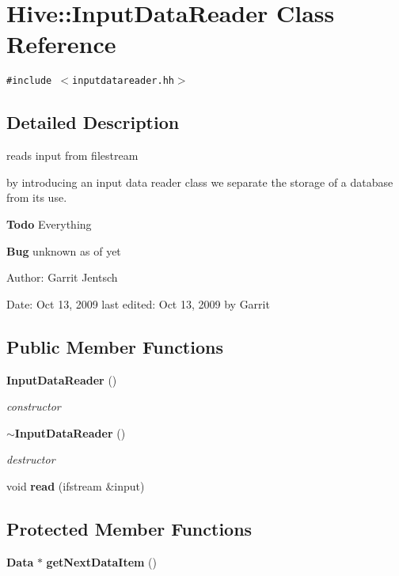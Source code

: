 \section{Hive::InputDataReader Class Reference}
\label{classHive_1_1InputDataReader}
{\tt \#include $<$inputdatareader.hh$>$}



\subsection{Detailed Description}
reads input from filestream 

by introducing an input data reader class we separate the storage of a database from its use.

\begin{Desc}
\item[{\bf Todo}]Everything\end{Desc}
\begin{Desc}
\item[{\bf Bug}]unknown as of yet\end{Desc}
\begin{Desc}
\item[Author:]Garrit Jentsch\end{Desc}
\begin{Desc}
\item[Date:]Oct 13, 2009 last edited: Oct 13, 2009 by Garrit \end{Desc}
\subsection*{Public Member Functions}
\begin{CompactItemize}
\item 
{\bf InputDataReader} ()
\begin{CompactList}\small\item\em constructor \item\end{CompactList}\item 
{\bf $\sim$InputDataReader} ()
\begin{CompactList}\small\item\em destructor \item\end{CompactList}\item 
void {\bf read} (ifstream \&input)
\end{CompactItemize}
\subsection*{Protected Member Functions}
\begin{CompactItemize}
\item 
{\bf Data} $\ast$ {\bf getNextDataItem} ()
\end{CompactItemize}


